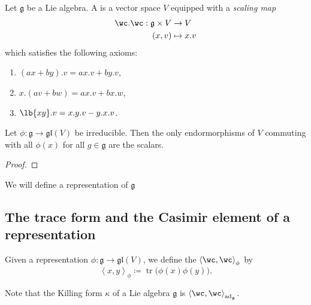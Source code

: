 \documentclass{article}
\newcommand\ip[1]{\left\langle{#1}\right\rangle}
\DeclarePairedDelimiter\lb\lbrack\rbrack
\DeclareMathOperator{\tr}{tr}
\newcommand*\ad{\operatorname{ad}}
\newcommand*\frkg{{\ensuremath{\mathfrak{g}}}}
\newcommand*\gl{\ensuremath{\mathfrak{gl}}}
\begin{document}
\begin{definition}
    Let $\frkg$ be a Lie algebra.
    A \defstyle{$\frkg$-module} is a vector space $V$ equipped with a \textit{scaling map}
    \begin{align*}
        \wc . \wc:
        \frkg \times V
        &\to
        V
        \\
        (x, v)
        &\mapsto
        x.v
    \end{align*}
    which satisfies the following axioms:
    \begin{enumerate}[label=(M\arabic*)]
        \item \label{ax:ModuleLeftDistribute}
            $(ax + by).v  = ax.v + by.v$,
        \item \label{ax:ModuleRightDistribute}
            $x.(av + bw) = ax.v + bx.w$,
        \item \label{ax:ModuleBracket}
            $\lb{xy}.v = x.y.v - y.x.v$.
    \end{enumerate}

\end{definition}

\begin{theorem}
    Let $\phi: \frkg \to \gl(V)$ be irreducible.
    Then the only endormorphisms of $V$ commuting with all $\phi(x)$ for all $g \in \frkg$ are the scalars.
\end{theorem}
\begin{proof}
\end{proof}

We will define a representation of $\frkg$

\begin{definition}

\end{definition}

\subsection{The trace form and the Casimir element of a representation}

\begin{definition}
    Given a representation $\phi: \frkg \to \gl(V)$, we define the  $\ip{\wc,\wc}_\phi$ by
    \[
        \ip{x,y}_\phi
        \coloneq
        \tr\big(
            \phi(x)\phi(y)
        \big).
    \]
\end{definition}

Note that the Killing form $\kappa$ of a Lie algebra $\frkg$ is $\ip{\wc,\wc}_{\ad_\frkg}$.
\end{document}
